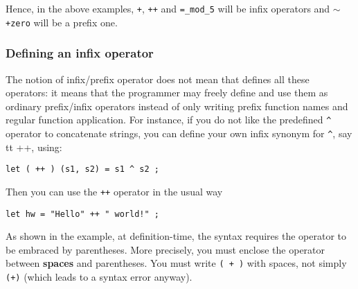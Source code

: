 
Hence, in the above examples, {\tt +}, {\tt ++} and {\tt =\_mod\_5} will be
infix operators and {\tt $\sim$+zero} will be a prefix one.

\subsubsection{Defining an infix operator}

The notion of infix/prefix operator does not mean that {\focal} defines all
these operators: it means that the programmer may freely define and use them
as ordinary prefix/infix operators instead of only writing prefix function
names and regular function application. For instance, if you do not like the
{\focal} predefined \verb"^" operator to concatenate strings, you can define your
own infix synonym for \verb"^", say {tt ++}, using:

{\scriptsize
\begin{lstlisting}
let ( ++ ) (s1, s2) = s1 ^ s2 ;
\end{lstlisting}
}
Then you can use the {\tt ++} operator in the usual way
{\scriptsize
\begin{lstlisting}
let hw = "Hello" ++ " world!" ;
\end{lstlisting}
}

As shown in the example, at definition-time, the syntax requires
the operator to be embraced by parentheses. More precisely, you must
enclose the operator between {\bf spaces} and parentheses.
You must write {\tt ( + )} with spaces, not simply {\tt (+)} (which leads
to a syntax error anyway).

